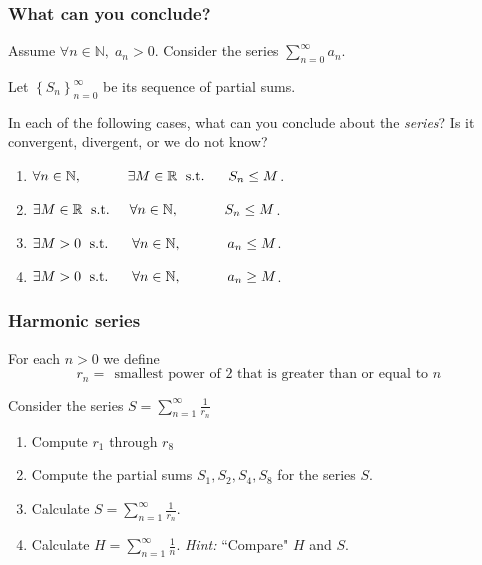 \begin{frame}[t]
	\fontsize{13}{13}\selectfont
	\frametitle{What can you conclude?}

	Assume $\displaystyle \forall n \in \mathbb{N}, \; a_{n}>0$. Consider the
	series $\displaystyle \sum_{n=0}^{\infty}a_{n}$.

	Let $\displaystyle \left\{ S_{n}\right\}_{n=0}^{\infty}$ be its sequence of
	partial sums.
	\vspace{.5cm}

	In each of the following cases, what can you conclude about the \emph{series}?
	Is it convergent, divergent, or we do not know?
	\vspace{.5cm}

	\begin{enumerate}
		\item $\displaystyle \forall n \in \mathbb{N}, \; \text{ \phantom{s.t.} }\quad
			\exists M \in \mathbb{R}\; \text{ s.t. }\; \quad S_{n}\leq M$.

		\item $\displaystyle \exists M \in \mathbb{R}\; \text{ s.t. }\quad \forall n
			\in \mathbb{N}, \; \text{ \phantom{s.t.} }\quad S_{n}\leq M$.

		\item $\displaystyle \exists M >0 \; \text{ s.t. }\; \quad \forall n \in \mathbb{N}
			, \; \text{ \phantom{s.t.} }\quad a_{n}\leq M$.

		\item $\displaystyle \exists M >0 \; \text{ s.t. }\; \quad \forall n \in \mathbb{N}
			, \; \text{ \phantom{s.t.} }\quad a_{n}\geq M$.
	\end{enumerate}
\end{frame}

\begin{frame}[t]
	\fontsize{13}{13}\selectfont
	\frametitle{Harmonic series}

	For each $n >0$ we define
	\[
		r_{n}= \; \, \text{smallest power of $2$ that is greater than or equal to
		$n$}\,
	\]
	\vspace{-.7cm}

	Consider the series $\displaystyle S = \sum_{n=1}^{\infty}\frac{1}{r_{n}}$
	\vspace{.2cm}

	\begin{enumerate}
		\item Compute $\displaystyle r_{1}$ through $\displaystyle r_{8}$
			\vspace{.5cm}

		\item Compute the partial sums $\displaystyle S_{1}, S_{2}, S_{4}, S_{8}$ for
			the series $S$.
			\vspace{.2cm}

		\item Calculate $\displaystyle S = \sum_{n=1}^{\infty}\frac{1}{r_{n}}$.

		\item Calculate $\displaystyle H = \sum_{n=1}^{\infty}\frac{1}{n}$. \hfill
			\emph{Hint:} ``Compare" $H$ and $S$.
	\end{enumerate}
\end{frame}

